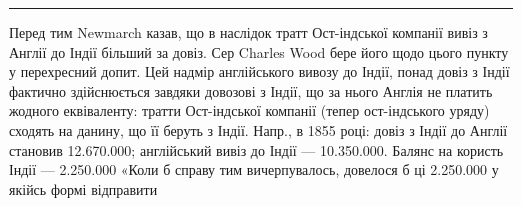 \pfbreak

Перед тим Newmarch казав, що в наслідок тратт Ост-індської компанії
вивіз з Англії до Індії більший за довіз. Сер Charles Wood бере його щодо
цього пункту у перехресний допит. Цей надмір англійського вивозу до Індії, понад
довіз з Індії фактично здійснюється завдяки довозові з Індії, що за нього Англія
не платить жодного еквіваленту: тратти Ост-індської компанії (тепер ост-індського
уряду) сходять на данину, що її беруть з Індії. Напр., в 1855 році:
довіз з Індії до Англії становив \num{12.670.000}; англійський вивіз до Індії —
\num{10.350.000}. Балянс на користь Індії — \num{2.250.000} «Коли б справу
тим вичерпувалось, довелося б ці \num{2.250.000} у якійсь формі відправити
\parbreak{}  %
